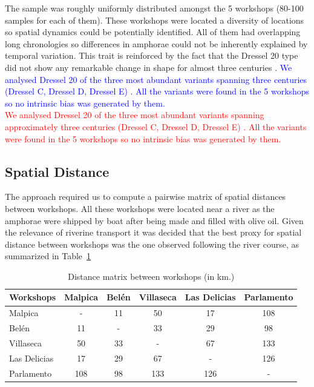 \documentclass[review]{elsarticle}
\newcommand{\memo}[2]{\textcolor{#1}{#2}}
\newcommand{\maria}[1]{\memo{red}{#1\\}}
\newcommand{\revise}[1]{\memo{blue}{#1\\}}
\begin{document}
The sample was roughly uniformly distributed amongst the 5 workshops (80-100 samples for each of them). These workshops were located a diversity of locations so spatial dynamics could be potentially identified. All of them had overlapping long chronologies so differences in amphorae could not be inherently explained by temporal variation. This trait is reinforced by the fact that the Dressel 20 type did not show any remarkable change in shape for almost three centuries \citep{berni_dressel_2016}. 
\revise{We analysed Dressel 20 of the three most abundant variants spanning three centuries (Dressel C, Dressel D, Dressel E) \citep{berni_millet_epigrafianforica_2008,martin-kilcher_romischen_1994}. All the variants were found in the 5 workshops so no intrinsic bias was generated by them.}
\maria{We analysed Dressel 20 of the three most abundant variants spanning approximately three centuries (Dressel C, Dressel D, Dressel E) \citep{berni_millet_epigrafianforica_2008,martin-kilcher_romischen_1994}. All the variants were found in the 5 workshops so no intrinsic bias was generated by them.}

\subsection{Spatial Distance}

The approach required us to compute a pairwise matrix of spatial distances between workshops. All these workshops were located near a river as the amphorae were shipped by boat after being made and filled with olive oil. Given the relevance of riverine transport it was decided that the best proxy for spatial distance between workshops was the one observed following the river course, as summarized in Table~\ref{table:distances}

\begin{table}[htp]
\centering

\begin{tabular}{lccccc}
\hline

\textbf{Workshops} & Malpica & Belén & Villaseca & Las Delicias & Parlamento \\ \hline
Malpica & - & 11 & 50 & 17 & 108 \\
Belén & 11 & - & 33 & 29 & 98 \\
Villaseca & 50 & 33 & - & 67 & 133 \\
Las Delicias & 17 & 29 & 67 & - & 126 \\
Parlamento & 108 & 98 & 133 & 126 & - \\
\hline
\end{tabular}
\caption{Distance matrix between workshops (in km.)}
\label{table:distances}
\end{table}
\end{document}
